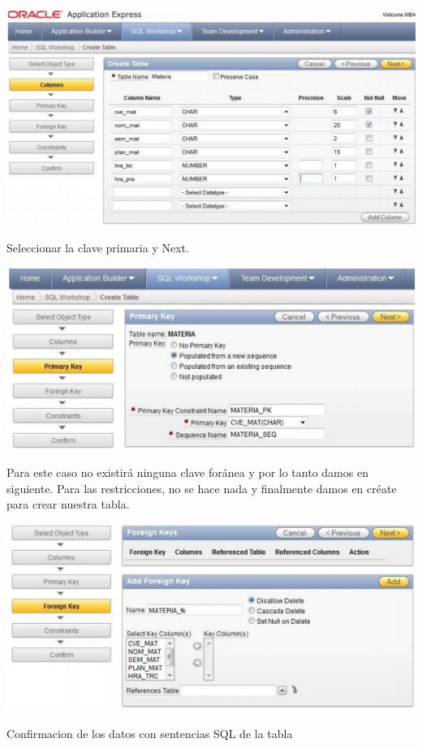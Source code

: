 \documentclass[12pt,letterpaper]{article}
\begin{document}
\begin{center}
\includegraphics[width=15cm]{./IMG/img17}
\end{center}
Seleccionar la clave primaria y Next. 
\begin{center}
\includegraphics[width=15cm]{./IMG/img18}
\end{center}
Para este caso no existirá ninguna clave foránea y por lo tanto damos en
siguiente. Para las restricciones, no se hace nada y finalmente damos en créate
para crear nuestra tabla. 
\begin{center}
\includegraphics[width=15cm]{./IMG/img19}
\end{center}
Confirmacion de los datos con sentencias SQL de la tabla
\end{document}
